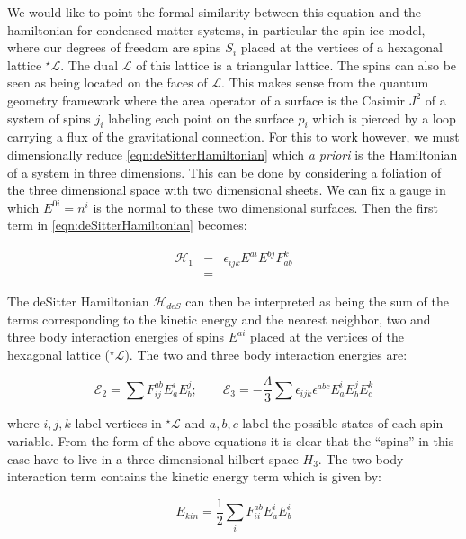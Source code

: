 \documentclass[11pt,english,rmp]{revtex4}
\begin{document}
We would like to point the formal similarity between this equation
and the hamiltonian for condensed matter systems, in particular the
spin-ice model, where our degrees of freedom are spins $S_{i}$ placed
at the vertices of a hexagonal lattice ${}^{\star}\mathcal{L}$. The
dual $\mathcal{L}$ of this lattice is a triangular lattice. The spins
can also be seen as being located on the faces of $\mathcal{L}$.
This makes sense from the quantum geometry framework where the area
operator of a surface is the Casimir $J^{2}$ of a system of spins
$j_{i}$ labeling each point on the surface $p_{i}$ which is pierced
by a loop carrying a flux of the gravitational connection. For this
to work however, we must dimensionally reduce \ref{eqn:deSitterHamiltonian}
which \emph{a priori} is the Hamiltonian of a system in three dimensions.
This can be done by considering a foliation of the three dimensional
space with two dimensional sheets. We can fix a gauge in which $E^{0i}=n^{i}$
is the normal to these two dimensional surfaces. Then the first term
in \ref{eqn:deSitterHamiltonian} becomes:

\begin{eqnarray}
\mathcal{H}_{1} & = & \epsilon_{ijk}E^{ai}E^{bj}F_{ab}^{k}\nonumber \\
 & =\end{eqnarray}


The deSitter Hamiltonian $\mathcal{H}_{deS}$ can then be interpreted
as being the sum of the terms corresponding to the kinetic energy
and the nearest neighbor, two and three body interaction energies
of spins $E^{ai}$ placed at the vertices of the hexagonal lattice
(${}^{\star}\mathcal{L}$). The two and three body interaction energies
are:

\begin{equation}
\mathcal{E}_{2}=\sum F_{ij}^{ab}E_{a}^{i}E_{b}^{j};\qquad\mathcal{E}_{3}=-\frac{\Lambda}{3}\sum\epsilon_{ijk}\epsilon^{abc}E_{a}^{i}E_{b}^{j}E_{c}^{k}\label{eqn:nBodyEnergy}\end{equation}


where $i,j,k$ label vertices in $^{\star}\mathcal{L}$ and $a,b,c$
label the possible states of each spin variable. From the form of
the above equations it is clear that the {}``spins'' in this case
have to live in a three-dimensional hilbert space $H_{3}$. The two-body
interaction term contains the kinetic energy term which is given by:

\begin{equation}
E_{kin}=\frac{1}{2}\sum_{i}F_{ii}^{ab}E_{a}^{i}E_{b}^{i}\label{eqn:kinTerm}\end{equation}
\end{document}
